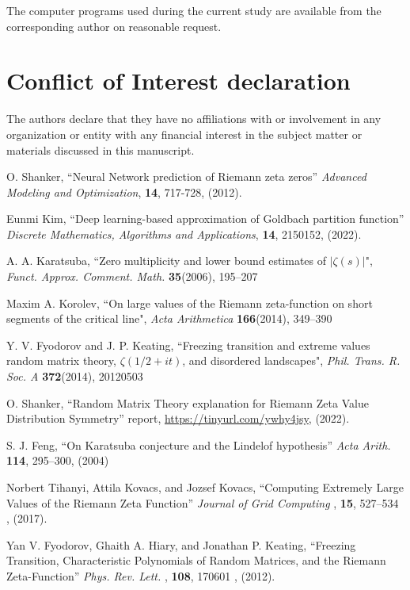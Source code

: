 \documentclass[twoside]{article}
\begin{document}
The computer programs used during the current study are
available from the corresponding author on reasonable request.

\section*{Conflict of Interest declaration} 

The authors declare that they have no affiliations with or involvement in any organization 
or entity with any financial interest in the subject matter or materials discussed 
in this manuscript.



\begin{thebibliography}{10}

 O. Shanker, ``Neural Network prediction of Riemann zeta zeros''
{\it Advanced Modeling and Optimization}, {\bf 14}, 717-728, (2012). 

 Eunmi Kim, ``Deep learning-based approximation of Goldbach partition function''
{\it  Discrete Mathematics, Algorithms and Applications}, {\bf 14}, 2150152, (2022). 

 A. A. Karatsuba, 
``Zero multiplicity and lower bound estimates of $|\zeta(s)|$",
{\it Funct.  Approx. Comment. Math.} {\bf35}(2006), 195–207

 Maxim A. Korolev, 
``On large values of the Riemann zeta-function on short segments of the critical line",
{\it Acta Arithmetica} {\bf166}(2014), 349–390

 Y. V. Fyodorov and J. P. Keating,
``Freezing transition and extreme values random matrix theory, $\zeta(1/2 + it)$, and disordered landscapes",
{\it Phil. Trans. R. Soc. A} {\bf372}(2014),  20120503

 O. Shanker, 
``Random Matrix Theory explanation for Riemann Zeta Value Distribution Symmetry''
 report,
\url{https://tinyurl.com/ywhy4jsy}, 
(2022). 

 S. J. Feng, ``On Karatsuba conjecture and the Lindelof hypothesis'' 
{\it  Acta Arith.} {\bf 114}, 295–300,  (2004)

 Norbert Tihanyi, Attila Kovacs,  and Jozsef Kovacs, 
``Computing Extremely Large Values of the Riemann Zeta Function''
{\it  Journal of Grid Computing }, {\bf 15}, 527–534 , (2017). 

Yan V. Fyodorov, Ghaith A. Hiary, and Jonathan P. Keating, 
``Freezing Transition, Characteristic Polynomials of Random Matrices, and the Riemann Zeta-Function''
{\it  Phys. Rev. Lett. }, {\bf 108}, 170601 , (2012). 


\end{thebibliography}
\end{document}
